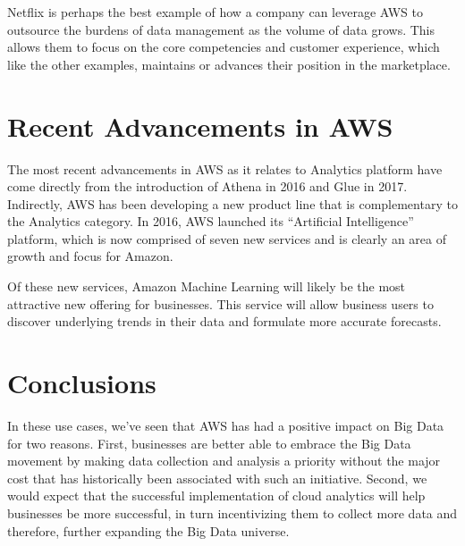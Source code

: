 \documentclass[sigconf]{acmart}
\begin{document}
Netflix is perhaps the best example of how a company can leverage AWS to outsource the burdens of data management as the volume of data grows. This allows them to focus on the core competencies and customer experience, which like the other examples, maintains or advances their position in the marketplace. 

\section{Recent Advancements in AWS}
The most recent advancements in AWS as it relates to Analytics platform have come directly from the introduction of Athena in 2016 and Glue in 2017. Indirectly, AWS has been developing a new product line that is complementary to the Analytics category. In 2016, AWS launched its ``Artificial Intelligence'' platform, which is now comprised of seven new services and is clearly an area of growth and focus for Amazon.

Of these new services, Amazon Machine Learning will likely be the most attractive new offering for businesses. This service will allow business users to discover underlying trends in their data and formulate more accurate forecasts.

\section{Conclusions}
In these use cases, we've seen that AWS has had a positive impact on Big Data for two reasons. First, businesses are better able to embrace the Big Data movement by making data collection and analysis a priority without the major cost that has historically been associated with such an initiative. Second, we would expect that the successful implementation of cloud analytics will help businesses be more successful, in turn incentivizing them to collect more data and therefore, further expanding the Big Data universe.


 
\end{document}
